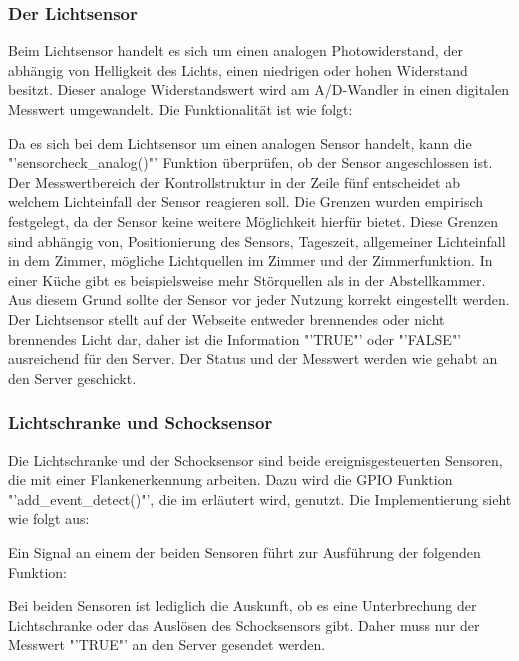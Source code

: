 \subsubsection*{Der Lichtsensor}
	Beim Lichtsensor handelt es sich um einen analogen Photowiderstand, der abhängig von Helligkeit des Lichts, einen niedrigen oder hohen Widerstand besitzt. Dieser analoge Widerstandswert wird am A/D-Wandler in einen digitalen Messwert umgewandelt. Die Funktionalität ist wie folgt:
	
	Da es sich bei dem Lichtsensor um einen analogen Sensor handelt, kann die "'sensorcheck\_analog()"' Funktion überprüfen, ob der Sensor angeschlossen ist. Der Messwertbereich der Kontrollstruktur in der Zeile fünf entscheidet ab welchem Lichteinfall der Sensor reagieren soll. Die Grenzen wurden empirisch festgelegt, da der Sensor keine weitere Möglichkeit hierfür bietet. Diese Grenzen sind abhängig von, Positionierung des Sensors, Tageszeit, allgemeiner Lichteinfall in dem Zimmer, mögliche Lichtquellen im Zimmer und der Zimmerfunktion. In einer Küche gibt es beispielsweise mehr Störquellen als in der Abstellkammer. Aus diesem Grund sollte der Sensor vor jeder Nutzung korrekt eingestellt werden. Der Lichtsensor stellt auf der Webseite entweder brennendes oder nicht brennendes Licht dar, daher ist die Information "'TRUE"' oder "'FALSE"' ausreichend für den Server. Der Status und der Messwert werden wie gehabt an den Server geschickt.
\subsubsection*{Lichtschranke und Schocksensor}
	Die Lichtschranke und der Schocksensor sind beide ereignisgesteuerten Sensoren, die mit einer Flankenerkennung arbeiten. Dazu wird die GPIO Funktion "'add\_event\_detect()"', die im  erläutert wird, genutzt. Die Implementierung sieht wie folgt aus:
	
	Ein Signal an einem der beiden Sensoren führt zur Ausführung der folgenden Funktion:
	
	Bei beiden Sensoren ist lediglich die Auskunft, ob es eine Unterbrechung der Lichtschranke oder das Auslösen des Schocksensors gibt. Daher muss nur der Messwert "'TRUE"' an den Server gesendet werden.
